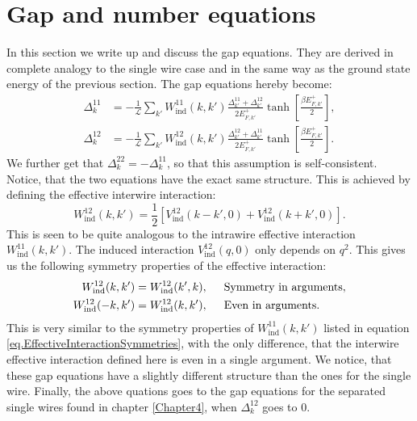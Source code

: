 \section{Gap and number equations}
\label{sec.2wiresgapandnumberequations}
In this section we write up and discuss the gap equations. They are derived in complete analogy to the single wire case and in the same way as the ground state energy of the previous section. The gap equations hereby become:
\begin{align}
\Delta^{11}_k &= -\frac{1}{\mathcal{L}}\sum_{k'} W_{\text{ind}}^{11}(k, k')\frac{\Delta^{11}_{k'} + \Delta^{12}_{k'}}{2E^{+}_{F,k'}}\tanh\left[\frac{\beta E^{+}_{F,k'}}{2}\right], \nonumber \\
\Delta^{12}_k &= -\frac{1}{\mathcal{L}}\sum_{k'} W_{\text{ind}}^{12}(k, k')\frac{\Delta^{12}_{k'} + \Delta^{11}_{k'}}{2E^{+}_{F,k'}}\tanh\left[\frac{\beta E^{+}_{F,k'}}{2}\right].
\label{eq.2wiresgapequations}
\end{align}
We further get that $\Delta^{22}_k = - \Delta^{11}_k$, so that this assumption is self-consistent. Notice, that the two equations have the exact same structure. This is achieved by defining the effective interwire interaction: 
\begin{equation}
W_{\text{ind}}^{12}(k, k') = \frac{1}{2}\left[V_{\text{ind}}^{12}(k - k', 0) + V_{\text{ind}}^{12}(k + k', 0) \right].
\end{equation}
This is seen to be quite analogous to the intrawire effective interaction $W_{\text{ind}}^{11}(k, k')$. The induced interaction $V_{\text{ind}}^{12}(q, 0)$ only depends on $q^2$. This gives us the following symmetry properties of the effective interaction:
\begin{align}
W_{\text{ind}}^{12}(k,k')   &= W_{\text{ind}}^{12}(k',k), \hspace{0.5cm} \text{Symmetry in arguments}, \nonumber \\
W_{\text{ind}}^{12}(-k,k')  &= W_{\text{ind}}^{12}(k,k'), \hspace{0.5cm} \text{Even in arguments}.
\label{eq.EffectiveInterwireInteractionSymmetries}
\end{align}
This is very similar to the symmetry properties of $W_{\text{ind}}^{11}(k, k')$ listed in equation \ref{eq.EffectiveInteractionSymmetries}, with the only difference, that the interwire effective interaction defined here is even in a single argument. We notice, that these gap equations have a slightly different structure than the ones for the single wire. Finally, the above quations goes to the gap equations for the separated single wires found in chapter \ref{Chapter4}, when $\Delta^{12}_k$ goes to $0$.   	

